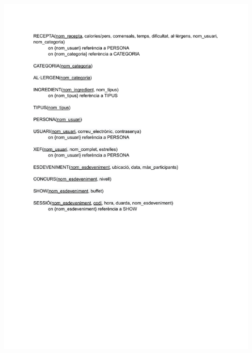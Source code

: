\documentclass[a4paper,12pt]{article}
\begin{document}
\begin{center}
	\noindent\includegraphics[width=\textwidth,page=2]{Model relacional.pdf}
\end{center}
\end{document}
